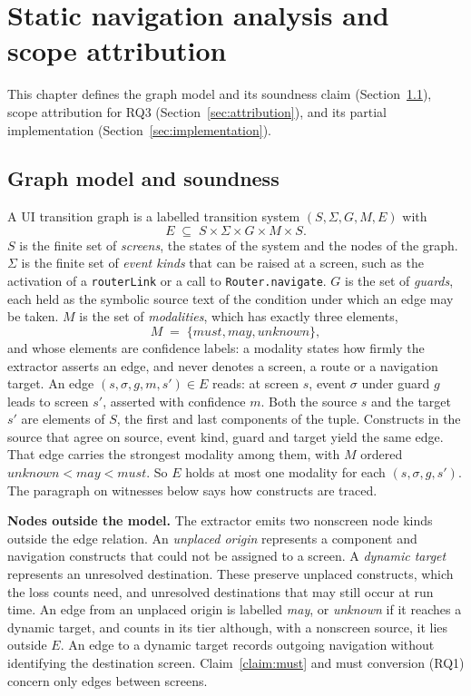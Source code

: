 \section{Static navigation analysis and scope attribution}
\label{ch:analysis}

This chapter defines the graph model and its soundness claim (Section~\ref{sec:model}), scope
attribution for RQ3 (Section~\ref{sec:attribution}), and its partial implementation
(Section~\ref{sec:implementation}).

\subsection{Graph model and soundness}
\label{sec:model}
\begin{definition}
A UI transition graph is a labelled transition system $(S, \Sigma, G, M, E)$ with
\[
  E \;\subseteq\; S \times \Sigma \times G \times M \times S .
\]
$S$ is the finite set of \emph{screens}, the states of the system and the nodes of the
graph. $\Sigma$ is the finite set of \emph{event kinds} that can be raised at a screen,
such as the activation of a \texttt{routerLink} or a call to \texttt{Router.navigate}.
$G$ is the set of \emph{guards}, each held as the symbolic source text of the condition
under which an edge may be taken. $M$ is the set of \emph{modalities}, which has
exactly three elements,
\[
  M \;=\; \{\mathit{must}, \mathit{may}, \mathit{unknown}\},
\]
and whose elements are confidence labels: a modality states how firmly the extractor
asserts an edge, and never denotes a screen, a route or a navigation target. An edge
$(s, \sigma, g, m, s') \in E$ reads: at screen $s$, event $\sigma$ under guard $g$ leads
to screen $s'$, asserted with confidence $m$. Both the source $s$ and the target $s'$
are elements of $S$, the first and last components of the tuple. Constructs
in the source that agree on source, event kind, guard and target yield the same edge. That edge
carries the strongest modality among them, with $M$ ordered
$\mathit{unknown} < \mathit{may} < \mathit{must}$. So $E$ holds at most one modality for each
$(s, \sigma, g, s')$. The paragraph on witnesses below says how constructs are traced.
\end{definition}

\textbf{Nodes outside the model.} The extractor emits two nonscreen node kinds outside the
edge relation. An \emph{unplaced origin} represents a component and navigation constructs that
could not be assigned to a screen. A \emph{dynamic target} represents an unresolved
destination. These preserve unplaced constructs, which the loss counts need, and unresolved destinations that may
still occur at run time. An edge from an unplaced origin is labelled \emph{may}, or \emph{unknown}
if it reaches a dynamic target, and counts in its tier although, with a nonscreen source, it lies outside $E$. An edge to a dynamic target records outgoing navigation without identifying the destination
screen. Claim~\ref{claim:must} and must conversion (RQ1) concern only edges between screens.

